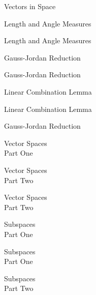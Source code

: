 \documentclass{titlescreen}
\begin{document}
\begin{videotitle}
  Vectors in Space
\end{videotitle}
\begin{videoend}
  Length and Angle Measures 
\end{videoend}

\begin{videotitle}
  Length and Angle Measures 
\end{videotitle}
\begin{videoend}
  Gauss-Jordan Reduction 
\end{videoend}


\begin{videotitle}
  Gauss-Jordan Reduction 
\end{videotitle}
\begin{videoend}
  Linear Combination Lemma 
\end{videoend}

\begin{videotitle}
  Linear Combination Lemma 
\end{videotitle}
\begin{videoend}
  Gauss-Jordan Reduction 
\end{videoend}



\begin{videotitle}
  Vector Spaces  \\[1ex]
  Part One
\end{videotitle}
\begin{videoend}
  Vector Spaces \\[1ex]
  Part Two 
\end{videoend}

% 
\begin{videotitle}
  Vector Spaces  \\[1ex]
  Part Two
\end{videotitle}
\begin{videoend}
  Subspaces \\[1ex]
  Part One
\end{videoend}

\begin{videotitle}
  Subspaces  \\[1ex]
  Part One
\end{videotitle}
\begin{videoend}
  Subspaces \\[1ex]
  Part Two 
\end{videoend}
\end{document}
